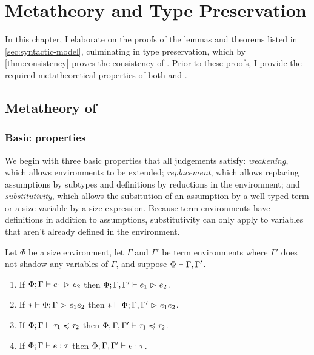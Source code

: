 \chapter{Metatheory and Type Preservation} \label{ch:proofs}

In this chapter, I elaborate on the proofs of the lemmas and theorems listed in \cref{sec:syntactic-model},
culminating in type preservation, which by \cref{thm:consistency} proves the consistency of \lang.
Prior to these proofs, I provide the required metatheoretical properties of both \lang and \CICE.

\section{Metatheory of \lang}

\subsection{Basic properties}

We begin with three basic properties that all judgements satisfy:
\emph{weakening}, which allows environments to be extended;
\emph{replacement}, which allows replacing assumptions by subtypes
and definitions by reductions in the environment;
and \emph{substitutivity}, which allows the subsitution of an assumption by a well-typed term
or a size variable by a size expression.
Because term environments have definitions in addition to assumptions,
substitutivity can only apply to variables that aren't already defined in the environment.

\begin{lemma}[Weakening] \label{lem:weakening}
Let $\Phi$ be a size environment,
let $\Gamma$ and $\Gamma'$ be term environments
where $\Gamma'$ does not shadow any variables of $\Gamma$,
and suppose $\Phi \mathrel{\vdash} \Gamma, \Gamma'$.
\begin{enumerate}[noitemsep]
  \item \label{item:weakening:red} If $\Phi; \Gamma \mathrel{\vdash} e_1 \mathrel{\rhd}_{} e_2$ then $\Phi; \Gamma, \Gamma' \mathrel{\vdash} e_1 \mathrel{\rhd}_{} e_2$.
  \item \label{item:weakening:red*} If $* \mathrel{\vdash} \Phi; \Gamma \mathrel{\rhd}_{} e_1{e_2}$ then $* \mathrel{\vdash} \Phi; \Gamma, \Gamma' \mathrel{\rhd}_{} e_1{e_2}$.
  \item \label{item:weakening:subtype} If $\Phi; \Gamma \mathrel{\vdash} \tau_1 \mathrel{\preccurlyeq} \tau_2$ then $\Phi; \Gamma, \Gamma' \mathrel{\vdash} \tau_1 \mathrel{\preccurlyeq} \tau_2$.
  \item If $\Phi; \Gamma \mathrel{\vdash} e \mathrel{:} \tau$ then $\Phi; \Gamma, \Gamma' \mathrel{\vdash} e \mathrel{:} \tau$.
\end{enumerate}
\end{lemma}

